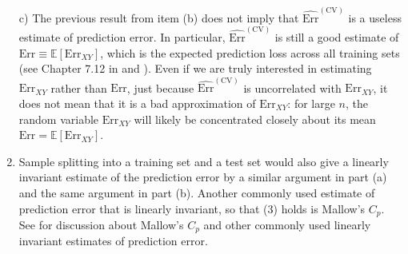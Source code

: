 \begin{enumerate}[label=(\alph*)]
\item[c)] The previous result from item (b) does not imply that $\widehat{\text{Err}}^{(\text{CV})}$ is a useless estimate of prediction error. In particular,  $\widehat{\text{Err}}^{(\text{CV})}$ is still a good estimate of $\text{Err} \equiv \mathbb{E}[ \text{Err}_{XY} ]$, which is the expected prediction loss across all training sets (see Chapter 7.12 in \cite{hastie2009elements} and \cite{Bates2022CrossVal}). Even if we are truly interested in estimating $\text{Err}_{XY}$ rather than $\text{Err}$, just because $\widehat{\text{Err}}^{(\text{CV})}$ is uncorrelated with  $\text{Err}_{XY}$, it does not mean that it is a bad approximation of $\text{Err}_{XY}$: for large $n$, the random variable $\text{Err}_{XY}$ will likely be concentrated closely about its mean $\text{Err}=\mathbb{E}[ \text{Err}_{XY} ]$.


\item Sample splitting into a training set and a test set would also give a linearly invariant estimate of the prediction error by a similar argument in part (a) and the same argument in part (b). Another commonly used estimate of prediction error that is linearly invariant, so that (3) holds is Mallow's $C_p$. See \cite{Bates2022CrossVal} for discussion about Mallow's $C_p$ and other commonly used linearly invariant estimates of prediction error.

\end{enumerate}